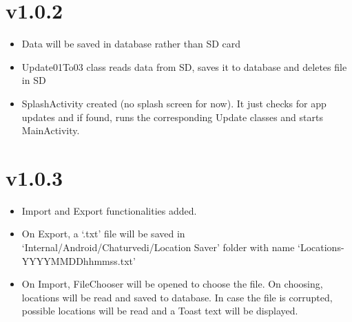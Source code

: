 \documentclass{article}
\begin{document}
\section{v1.0.2}
\begin{itemize}
\item Data will be saved in database rather than SD card
\item Update01To03 class reads data from SD, saves it to database and deletes file in SD
\item SplashActivity created (no splash screen for now). It just checks for app updates and if found, runs the corresponding Update classes and starts MainActivity.
\end{itemize}

\section{v1.0.3}
\begin{itemize}
\item Import and Export functionalities added.
\item On Export, a `.txt' file will be saved in `Internal/Android/Chaturvedi/Location Saver' folder with name `Locations-YYYYMMDDhhmmss.txt'
\item On Import, FileChooser will be opened to choose the file. On choosing, locations will be read and saved to database. In case the file is corrupted, possible locations will be read and a Toast text will be displayed.
\end{itemize}
\end{document}
